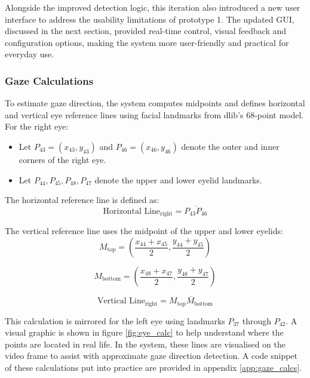 \documentclass[12pt]{article}
\theoremstyle{plain}
\theoremstyle{definition}
\begin{document}
Alongside the improved detection logic, this iteration also introduced a new user interface to address the usability limitations of prototype 1. The updated GUI, discussed in the next section, provided real-time control, visual feedback and configuration options, making the system more user-friendly and practical for everyday use.

\subsubsection{Gaze Calculations}
\label{gaze_cals}

To estimate gaze direction, the system computes midpoints and defines horizontal and vertical eye reference lines using facial landmarks from dlib's 68-point model. For the right eye:

\begin{itemize}

    \item Let \( P_{43} = (x_{43}, y_{43}) \) and \( P_{46} = (x_{46}, y_{46}) \) denote the outer and inner corners of the right eye.

    \item Let \( P_{44}, P_{45}, P_{48}, P_{47} \) denote the upper and lower eyelid landmarks.

\end{itemize}
The horizontal reference line is defined as:
\[
\text{Horizontal Line}_{\text{right}} = \overline{P_{43}P_{46}}
\]

The vertical reference line uses the midpoint of the upper and lower eyelids:
\[
M_{\text{top}} = \left( \frac{x_{44} + x_{45}}{2}, \frac{y_{44} + y_{45}}{2} \right)
\]

\[
M_{\text{bottom}} = \left( \frac{x_{48} + x_{47}}{2}, \frac{y_{48} + y_{47}}{2} \right)
\]

\[
\text{Vertical Line}_{\text{right}} = \overline{M_{\text{top}}M_{\text{bottom}}}
\]

This calculation is mirrored for the left eye using landmarks \( P_{37} \) through \( P_{42} \). A visual graphic is shown in figure \ref{fig:eye_calc} to help understand where the points are located in real life. In the system, these lines are visualised on the video frame to assist with approximate gaze direction detection. A code snippet of these calculations put into practice are provided in appendix \ref{app:gaze_calcs}.
\end{document}
